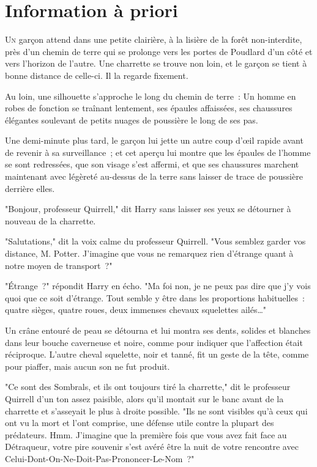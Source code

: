\chapter{Information à priori}

\lettrine{U}{n} garçon attend dans une petite clairière, à la lisière de la forêt non-interdite, près d'un chemin de terre qui se prolonge vers les portes de Poudlard d'un côté et vers l'horizon de l'autre. Une charrette se trouve non loin, et le garçon se tient à bonne distance de celle-ci. Il la regarde fixement.

Au loin, une silhouette s'approche le long du chemin de terre~: Un homme en robes de fonction se traînant lentement, ses épaules affaissées, ses chaussures élégantes soulevant de petits nuages de poussière le long de ses pas.

Une demi-minute plus tard, le garçon lui jette un autre coup d'œil rapide avant de revenir à sa surveillance~; et cet aperçu lui montre que les épaules de l'homme se sont redressées, que son visage s'est affermi, et que ses chaussures marchent maintenant avec légèreté au-dessus de la terre sans laisser de trace de poussière derrière elles.

"Bonjour, professeur Quirrell," dit Harry sans laisser ses yeux se détourner à nouveau de la charrette.

"Salutations," dit la voix calme du professeur Quirrell. "Vous semblez garder vos distance, M. Potter. J'imagine que vous ne remarquez rien d'étrange quant à notre moyen de transport~?"

"Étrange~?" répondit Harry en écho. "Ma foi non, je ne peux pas dire que j'y vois quoi que ce soit d'étrange. Tout semble y être dans les proportions habituelles~: quatre sièges, quatre roues, deux immenses chevaux squelettes ailés…"

Un crâne entouré de peau se détourna et lui montra ses dents, solides et blanches dans leur bouche caverneuse et noire, comme pour indiquer que l'affection était réciproque. L'autre cheval squelette, noir et tanné, fit un geste de la tête, comme pour piaffer, mais aucun son ne fut produit.

"Ce sont des Sombrals, et ils ont toujours tiré la charrette," dit le professeur Quirrell d'un ton assez paisible, alors qu'il montait sur le banc avant de la charrette et s'asseyait le plus à droite possible. "Ils ne sont visibles qu'à ceux qui ont vu la mort et l'ont comprise, une défense utile contre la plupart des prédateurs. Hmm. J'imagine que la première fois que vous avez fait face au Détraqueur, votre pire souvenir s'est avéré être la nuit de votre rencontre avec Celui-Dont-On-Ne-Doit-Pas-Prononcer-Le-Nom~?"

